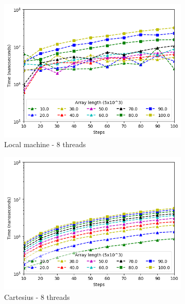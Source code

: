 \documentclass[a4paper]{article}
\begin{document}
\begin{figure}[htbp]
\begin{subfigure}{.42\textwidth}
  \centering
  \includegraphics[width=\linewidth]{res/parallel/array_thread_8_steps_res.png}
  \caption{Local machine - 8 threads}
  \label{subfig:steps_thread8_parall}
\end{subfigure}%
\begin{subfigure}{.42\textwidth}
  \centering
  \includegraphics[width=\linewidth]{res/parallel/array_thread_8_steps_res_cartesius.png}
  \caption{Cartesius - 8 threads}
  \label{subfig:steps_thread8_parall_cart}
\end{subfigure}
\begin{subfigure}{.42\textwidth}
  \centering

\end{subfigure}
\end{figure}
\end{document}
